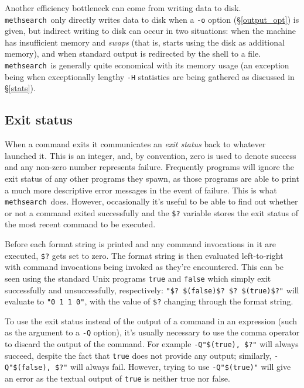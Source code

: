 \documentclass[a4paper,11pt,oneside]{book}
\def\textitidx#1{\textit{#1}\index{#1}}
\def\methsearch{\texttt{meth\-search}}
\newcommand{\sref}[1]{\hyperref[#1]{\S\ref{#1}}}
\begin{document}
Another efficiency bottleneck can come from writing data to disk.  \methsearch\ 
only directly writes data to disk when a \verb+-o+ option (\sref{output_opt})
is given, but indirect writing to disk can occur in two situations:
when the machine has insufficient memory and \textitidx{swaps} (that is,
starts using the disk as additional memory), and when standard output%
\index{standard output} is redirected\index{shell!redirection} by the shell
to a file.  \methsearch\ is generally quite economical with its memory usage
(an exception being when exceptionally lengthy \verb+-H+ statistics are
being gathered as discussed in \sref{stats}).

\subsection{Exit status}\label{exitstatus}

When a command exits it communicates an \textit{exit status}
back to whatever launched it.  This is an integer, and, by convention, zero
is used to denote success and any non-zero number represents failure.  
Frequently programs will ignore the exit status of any other programs they
spawn, as those programs are able to print a much more descriptive error 
messages in the event of failure.  This is what \methsearch\ does.
However, occasionally it's useful to be able to find out whether or not a 
command exited successfully and the \verb+$?+ variable stores the exit 
status of the most recent command to be executed.

Before each format string is printed and any command invocations in it are 
executed, \verb+$?+ gets set to zero.  The format string is then evaluated
left-to-right with command invocations being invoked as they're encountered.  
This can be seen using the standard Unix programs 
\verb+true+ and 
\verb+false+ which simply exit 
successfully and unsuccessfully, respectively:
\verb+"$? $(false)$? $? $(true)$?"+ will evaluate to \verb+"0 1 1 0"+, with the 
value of \verb+$?+ changing through the format string.

To use the exit status instead of the output of a command in an expression
(such as the argument to a \verb+-Q+ option),
it's usually necessary to use the comma operator%
 to discard the output of the command.  For example
\verb+-Q"$(true), $?"+ will always succeed, despite the fact that \verb+true+
does not provide any output; similarly, \verb+-Q"$(false), $?"+ will always
fail.  However, trying to use \verb+-Q"$(true)"+ will give an error as 
the textual output of \verb+true+ is neither true nor false.
\end{document}
